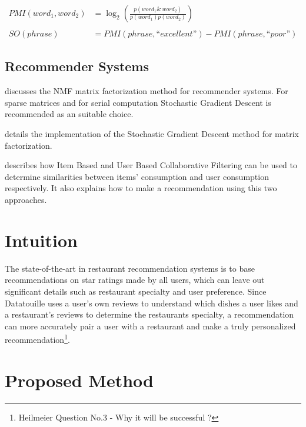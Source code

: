 \documentclass[twoside,12pt]{article}
\begin{document}
\begin{align}
PMI(word_1, word_2) &= \log_2 \left(\frac{p(word_1 \&\, word_2)}{p(word_1) p(word_2)}\right) \label{pmi}\\
\nonumber\\
SO(phrase) &= PMI(phrase, “excellent”) - PMI(phrase, “poor”) \label{pmi_so}
\end{align}

\subsection{Recommender Systems}
\cite{yehuda_matrix_factorization} discusses the NMF matrix factorization method for recommender systems. For sparse matrices and for serial computation Stochastic Gradient Descent is recommended as an suitable choice.

\cite{funk_matrix_factorization} details the implementation of the Stochastic Gradient Descent method for matrix factorization.

\cite{cf_online}  describes how Item Based and User Based Collaborative Filtering can be used to determine similarities between items' consumption and user consumption respectively. It also explains how to make a recommendation using this two approaches.

\section{Intuition}
\label{Inuition}
The state-of-the-art in restaurant recommendation systems is to base recommendations on star ratings made by all users, which can leave out significant details such as restaurant specialty and user preference. Since Datatouille uses a user's own reviews to understand which dishes a user likes and a restaurant's reviews to determine the restaurants specialty, a recommendation can more accurately pair a user with a restaurant and make a truly personalized recommendation\footnote{Heilmeier Question No.3 - Why it will be successful ?}.

\section{Proposed Method}
\label{Proposed Method}
\end{document}
